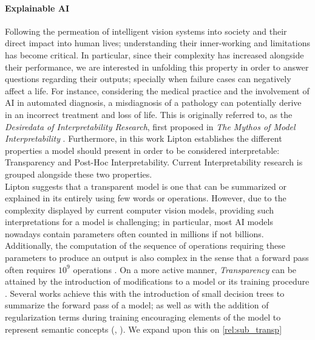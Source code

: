 \paragraph{Explainable AI} Following the permeation of intelligent vision systems into society and 
their direct impact into human lives; understanding their inner-working and limitations has become 
critical. In particular, since their complexity has increased alongside their performance, we are 
interested in unfolding this property in order to answer questions regarding their outputs; 
specially when failure cases can negatively affect a life. For instance, considering the medical 
practice and the involvement of AI in automated diagnosis, a misdiagnosis of a pathology can 
potentially derive in an incorrect treatment and loss of life. This is originally referred to, as the 
\emph{Desiredata of Interpretability Research}, first proposed in \emph{The Mythos of Model 
Interpretability} \autocite{mythos_interp}. Furthermore, in this work Lipton establishes the 
different properties a model should present in order to be considered interpretable: Transparency 
and Post-Hoc Interpretability. Current Interpretability research is grouped alongside these 
two properties.\\

\noindent Lipton suggests that a transparent model is one that can be summarized or explained 
in its entirely using few words or operations. However, due to the complexity displayed by current 
computer vision models, providing such interpretations for a model is challenging; in particular, 
most AI models nowadays contain parameters often counted in millions if not 
billions. Additionally, the computation of the sequence of operations requiring these parameters 
to produce an output is also complex in the sense that a forward pass often requires $10^9$ 
operations \autocite{openai_compute}. On a more active manner, \emph{Transparency} can be attained 
by the introduction of modifications to a model or its training procedure 
\autocite{zhang2021survey}. Several works achieve this with the introduction of small decision 
trees to summarize the forward pass of a model; as well as with the addition of regularization terms 
during training encouraging elements of the model to represent semantic concepts 
(\cite{bau2017network}, \cite{wu2018beyond}). We expand upon this on \autoref{rel:sub_transp}\\


